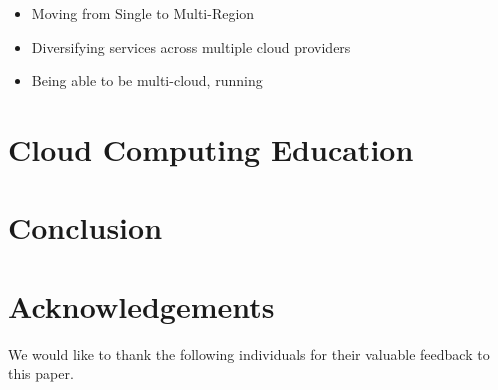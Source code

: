 \documentclass[conference]{IEEEconf}
\begin{document}
\begin{itemize}
	\item Moving from Single to Multi-Region
	\item Diversifying services across multiple cloud providers
	\item Being able to be multi-cloud, running 
\end{itemize}  

\section{Cloud Computing Education}


\section{Conclusion}


\section{Acknowledgements}
We would like to thank the following individuals for their valuable feedback to this paper. 


\end{document}
